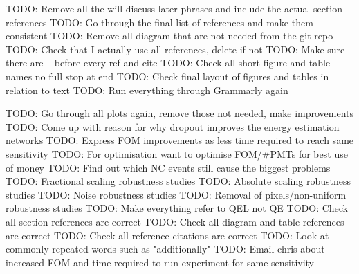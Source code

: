 TODO: Remove all the will discuss later phrases and include the actual section references
TODO: Go through the final list of references and make them consistent
TODO: Remove all diagram that are not needed from the git repo
TODO: Check that I actually use all references, delete if not
TODO: Make sure there are ~ before every ref and cite
TODO: Check all short figure and table names no full stop at end
TODO: Check final layout of figures and tables in relation to text
TODO: Run everything through Grammarly again

TODO: Go through all plots again, remove those not needed, make improvements
TODO: Come up with reason for why dropout improves the energy estimation networks
TODO: Express FOM improvements as less time required to reach same sensitivity
TODO: For optimisation want to optimise FOM/#PMTs for best use of money
TODO: Find out which NC events still cause the biggest problems
TODO: Fractional scaling robustness studies
TODO: Absolute scaling robustness studies
TODO: Noise robustness studies
TODO: Removal of pixels/non-uniform robustness studies
TODO: Make everything refer to QEL not QE
TODO: Check all section references are correct
TODO: Check all diagram and table references are correct
TODO: Check all reference citations are correct
TODO: Look at commonly repeated words such as "additionally"
TODO: Email chris about increased FOM and time required to run experiment for same sensitivity